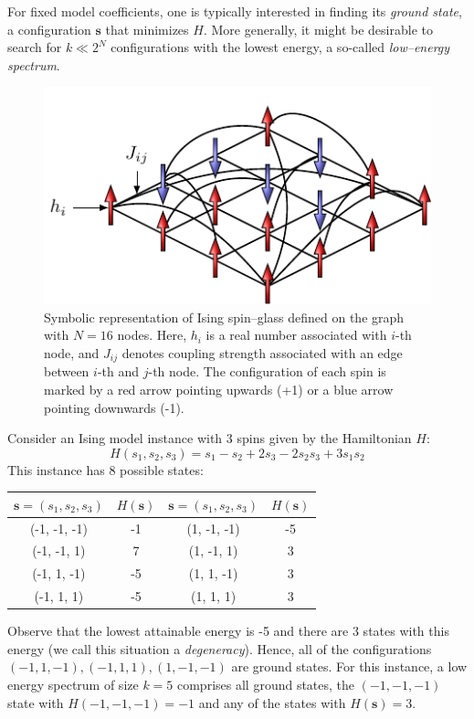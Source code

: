 For fixed model coefficients, one is typically interested in finding its \emph{ground state}, a
configuration $\mathbf{s}$ that minimizes $H$. More generally, it might be desirable to search for
$k \ll 2^N$ configurations with the lowest energy, a so-called \emph{low--energy spectrum}.

\begin{figure}[H]
    \centering
    \includegraphics{figures/spins.pdf}
    \caption{Symbolic representation of Ising spin--glass defined on the graph with $N=16$ nodes. Here, $h_i$ is a real number associated with $i$-th node, and $J_{ij}$ denotes coupling strength associated with an edge between $i$-th and $j$-th node. The configuration of each spin is marked by a red arrow pointing upwards (+1) or a blue arrow pointing downwards (-1).}
    \label{fig:my_label}
\end{figure}

\begin{example}
Consider an Ising model instance with 3 spins given by the Hamiltonian $H$:
\begin{equation}
H(s_1, s_2, s_3) = s_1 - s_2 +2s_3 - 2s_2s_3 + 3s_1s_2
\end{equation}
This instance has 8 possible states:

\begin{table}[h]
    \begin{center}
        \begin{tabular}{|c|c||c|c|}
        \hline
        $\mathbf{s}=(s_1, s_2, s_3)$ & 
        $H(\mathbf{s})$ & 
        $\mathbf{s}=(s_1, s_2, s_3)$ & 
        $H(\mathbf{s})$\\\hline
        (-1, -1, -1) & -1 & (1, -1, -1) & -5\\ \hline
        (-1, -1, 1) & 7 & (1, -1, 1) & 3 \\ \hline
        (-1, 1, -1) & -5 & (1, 1, -1) & 3 \\ \hline
        (-1, 1, 1) & -5 & (1, 1, 1) & 3\\ \hline
        \end{tabular}
    \end{center}
\end{table}
Observe that the lowest attainable energy is -5 and there are 3 states with this energy (we call
this situation a \emph{degeneracy}). Hence, all of the configurations $(-1, 1, -1), (-1, 1, 1), (1,
-1, -1)$ are ground states. For this instance, a low energy spectrum of size $k=5$ comprises all
ground states, the $(-1, -1, -1)$ state with $H(-1, -1, -1) = -1$ and any of the states with
$H(\mathbf{s})=3$.
\end{example}

